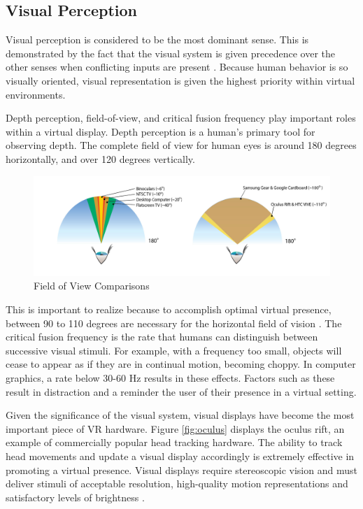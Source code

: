 \documentclass[12pt]{article}
\begin{document}

\subsection{Visual Perception}

Visual perception is considered to be the most dominant sense. This is demonstrated by the fact that the visual system is given precedence over the other senses when conflicting inputs are present \cite{gobbetti}. Because human behavior is so visually oriented, visual representation is given the highest priority within virtual environments.


\par Depth perception, field-of-view, and critical fusion frequency play important roles within a virtual display. Depth perception is a human's primary tool for observing depth. The complete field of view for human eyes is around 180 degrees horizontally, and over 120 degrees vertically. 
\begin{figure}[h]
    \centering
 \includegraphics[width=\textwidth]{photo7_fov}
  \caption{Field of View Comparisons \cite{pov}}
  \label{fig:fieldOfView}
 \end{figure}
 
This is important to realize because to accomplish optimal virtual presence, between 90 to 110 degrees are necessary for the horizontal field of vision \cite{gobbetti}. The critical fusion frequency is the rate that humans can distinguish between successive visual stimuli. For example, with a frequency too small, objects will cease to appear as if they are in continual motion, becoming choppy. In computer graphics, a rate below 30-60 Hz results in these effects. Factors such as these result in  distraction and a reminder the user of their presence in a virtual setting. 

\par Given the significance of the visual system, visual displays have become the most important piece of VR hardware. Figure \ref{fig:oculus} displays the oculus rift, an example of commercially popular head tracking hardware. The ability to track head movements and update a visual display accordingly is extremely effective in promoting a virtual presence. Visual displays require stereoscopic vision and must deliver stimuli of acceptable resolution, high-quality motion representations and satisfactory levels of brightness \cite{gobbetti}. 
\end{document}
